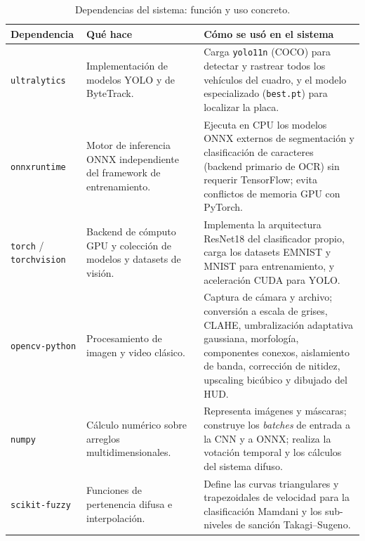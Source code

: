 \documentclass[11pt]{article}
\begin{document}
\begin{table}[H]
    \centering
    \footnotesize
    \caption{Dependencias del sistema: función y uso concreto.}
    \label{tab:dependencias}
    \renewcommand{\arraystretch}{1.25}
    \begin{tabular}{>{\raggedright\arraybackslash}p{2.6cm}
                    >{\raggedright\arraybackslash}p{4.2cm}
                    >{\raggedright\arraybackslash}p{7.0cm}}
        \toprule
        \textbf{Dependencia} & \textbf{Qué hace} & \textbf{Cómo se usó en el sistema} \\
        \midrule
        \texttt{ultralytics} & Implementación de modelos YOLO y de ByteTrack. &
        Carga \texttt{yolo11n} (COCO) para detectar y rastrear todos los vehículos del
        cuadro, y el modelo especializado (\texttt{best.pt}) para localizar la placa. \\

        \texttt{onnxruntime} & Motor de inferencia ONNX independiente del framework
        de entrenamiento. & Ejecuta en CPU los modelos ONNX externos de segmentación
        y clasificación de caracteres (backend primario de OCR) sin requerir
        TensorFlow; evita conflictos de memoria GPU con PyTorch. \\

        \texttt{torch} / \texttt{torchvision} & Backend de cómputo GPU y colección de
        modelos y datasets de visión. & Implementa la arquitectura ResNet18 del
        clasificador propio, carga los datasets EMNIST y MNIST para entrenamiento, y
        aceleración CUDA para YOLO. \\

        \texttt{opencv-python} & Procesamiento de imagen y video clásico. & Captura de
        cámara y archivo; conversión a escala de grises, CLAHE, umbralización
        adaptativa gaussiana, morfología, componentes conexos, aislamiento de banda,
        corrección de nitidez, upscaling bicúbico y dibujado del HUD. \\

        \texttt{numpy} & Cálculo numérico sobre arreglos multidimensionales. &
        Representa imágenes y máscaras; construye los \emph{batches} de entrada a la
        CNN y a ONNX; realiza la votación temporal y los cálculos del sistema difuso. \\

        \texttt{scikit-fuzzy} & Funciones de pertenencia difusa e interpolación. &
        Define las curvas triangulares y trapezoidales de velocidad para la
        clasificación Mamdani y los sub-niveles de sanción Takagi--Sugeno. \\


\end{tabular}
\end{table}
\end{document}
